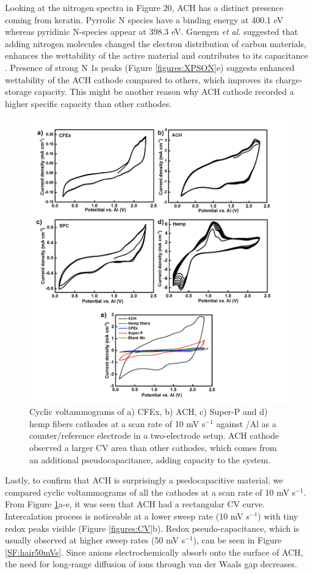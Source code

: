 Looking at the nitrogen spectra in Figure 20, ACH has a distinct presence coming from keratin. Pyrrolic N species have a binding energy at 400.1 eV whereas pyridinic N-species appear at 398.3 eV. Guengen \textit{et al.} suggested that adding nitrogen molecules changed the electron distribution of carbon materials, enhances the wettability of the active material and  contributes to its capacitance \cite{gueguen_xps_2016}. Presence of strong N 1s peaks (Figure \ref{figures:XPSON}e) suggests enhanced wettability of the ACH cathode compared to others, which improves its charge-storage capacity. This might be another reason why ACH cathode recorded a higher specific capacity than other cathodes. 
 \begin{figure}[tbh!]
  \centering
  \includegraphics[width=\textwidth]{Figures/chap5fig/CV}
    \caption{Cyclic voltammograms of a) CFEx, b) ACH, c) Super-P and d) hemp fibers cathodes at a scan rate of 10 mV s$^{-1}$ against /Al as a counter/reference electrode in a two-electrode setup. ACH cathode observed a larger CV area than other cathodes, which comes from an additional pseudocapacitance, adding capacity to the system.}
  \label{Figures/chap5fig:CV}
\end{figure}
Lastly, to confirm that ACH is surprisingly a psedocapacitive material, we compared cyclic voltammograms of all the cathodes at a scan rate of 10 mV s$^{-1}$. From Figure \ref{Figures/chap5fig:CV}a-e, it was seen that ACH had a rectangular CV curve. Intercalation process is noticeable at a lower sweep rate (10 mV s$^{-1}$) with tiny redox peaks visible (Figure \ref{figures:CV}b). Redox pseudo-capacitance, which is usually observed at higher sweep rates (50 mV s$^{-1}$), can be seen in Figure \ref{SF:hair50mVs}. Since  anions electrochemically absorb onto the surface of ACH, the  need for long-range diffusion of ions through van der Waals gap decreases. 

